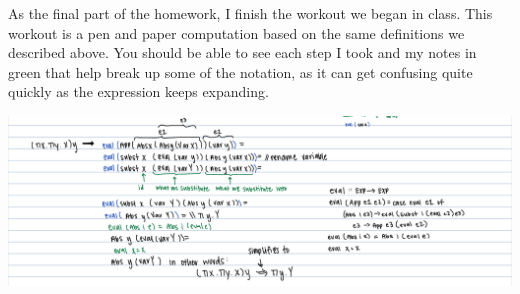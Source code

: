 \documentclass{article}
\theoremstyle{theorem}
\theoremstyle{definition}
\theoremstyle{remark}
\begin{document}
As the final part of the homework, I finish the workout we began in class. This workout is a pen and paper computation based on the same definitions we described above. You should be able to see each step I took and my notes in green that help break 
up some of the notation, as it can get confusing quite quickly as the expression keeps expanding.
\begin{center}
  \includegraphics[width=15cm]{Week4hw_InClassProblem.jpg}
\end{center}
\end{document}
